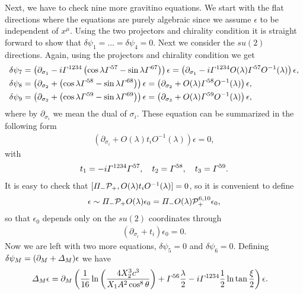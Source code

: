 \documentclass[11pt]{article}
\let\oldGamma=\Gamma
\let\oldDelta=\Delta
\let\oldPi=\Pi
\renewcommand{\Gamma}{\mathnormal{\oldGamma}}
\renewcommand{\Delta}{\mathnormal{\oldDelta}}
\renewcommand{\Pi}{\mathnormal{\oldPi}}
\newcommand{\sfrac}[2]{{\textstyle\frac{#1}{#2}}}
\newcommand{\p}{\partial}\newcommand{\quarter}{\sfrac{1}{4}}
\begin{document}
Next, we have to check nine more gravitino equations.
We start with the flat directions where the equations are purely algebraic since we assume $\epsilon$ to be independent of $x^\mu$.
Using the two projectors and chirality condition it is straight forward to show that $\delta \psi_1 = ... = \delta \psi_4 = 0$.
Next we consider the $su(2)$ directions. Again, using the projectors and chirality condition we get
\begin{align}
& \delta \psi_7 = \left(\p_{\sigma_1} - i\Gamma^{1234}\left(\cos\lambda\Gamma^{57} - \sin\lambda\Gamma^{67}\right)\right)\epsilon
= \left(\p_{\sigma_1} - i\Gamma^{1234}O(\lambda)\Gamma^{57}O^{-1}(\lambda)\right)\epsilon,\nonumber\\
& \delta \psi_8
= \left(\p_{\sigma_2} + \left(\cos\lambda\Gamma^{58} - \sin\lambda\Gamma^{68}\right)\right)\epsilon
= \left(\p_{\sigma_2} + O(\lambda)\Gamma^{58}O^{-1}(\lambda)\right)\epsilon,\nonumber\\
& \delta \psi_9 = \left(\p_{\sigma_3} + \left(\cos\lambda\Gamma^{59} - \sin\lambda\Gamma^{69}\right)\right)\epsilon
= \left(\p_{\sigma_3} + O(\lambda)\Gamma^{59}O^{-1}(\lambda)\right)\epsilon,\nonumber\\
\end{align}
where by $\p_{\sigma_i}$ we mean the dual of $\sigma_i$. These equation can be summarized in the following form
\begin{align}
\left(\p_{\sigma_i} + O(\lambda)t_i O^{-1}(\lambda)\right)\epsilon = 0,
\end{align}
with
\begin{align}
t_1 = - i\Gamma^{1234}\Gamma^{57},\quad
t_2 = \Gamma^{58},\quad
t_3 = \Gamma^{59}.
\end{align}
It is easy to check that $[\Pi_- \mathcal{P}_+, O(\lambda)t_i O^{-1}(\lambda)] = 0$, so it is convenient to define
\begin{align}
\epsilon \sim \Pi_- \mathcal{P}_+  O(\lambda) \epsilon_0
= \Pi_- O(\lambda) \mathcal{P}_+^{6,10}  \epsilon_0,
\end{align}
so that $\epsilon_0$ depends only on the $su(2)$ coordinates through
\begin{align}\label{eq:su2depnedenceofKS}
\left(\p_{\sigma_i} + t_i \right)\epsilon_0 = 0.
\end{align}
Now we are left with two more equations, $\delta\psi_5 = 0$ and $\delta\psi_6 = 0$.
Defining $\delta\psi_M = (\p_M + \Delta_M) \epsilon$ we have
\begin{align}\label{eq:deltam}
\Delta_M \epsilon %
&=\p_M \left(
\frac{1}{16}\ln\left(\frac{4 X_2^3 c^3}{X_1 A^{2} \cos^8\theta}\right)
+\Gamma^{56} \frac{\lambda}{2}
-i\Gamma^{1234} \frac{1}{2}\ln\tan\frac{\xi}{2} \right)\epsilon.
\end{align}
\end{document}
